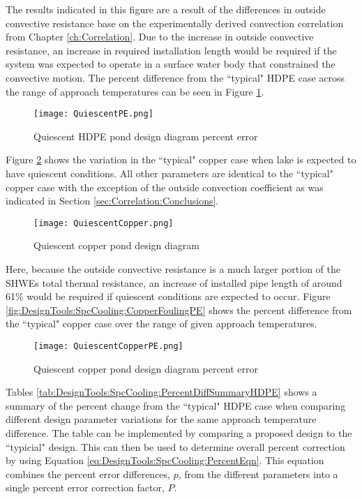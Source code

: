 The results indicated in this figure are a result of the differences in outside convective resistance base on the experimentally derived convection correlation from Chapter \ref{ch:Correlation}. Due to the increase in outside convective resistance, an increase in required installation length would be required if the system was expected to operate in a surface water body that constrained the convective motion. The percent difference from the ``typical" HDPE case across the range of approach temperatures can be seen in Figure \ref{fig:DesignTools:SpcCooling:QuiescentPE}.
	
	\begin{figure}
		\centering
		\texttt{[image: QuiescentPE.png]}
		\caption{Quiescent HDPE pond design diagram percent error}
		\label{fig:DesignTools:SpcCooling:QuiescentPE}
	\end{figure}
	
Figure \ref{fig:DesignTools:SpcCooling:QuiescentCopper} shows the variation in the ``typical" copper case when lake is expected to have quiescent conditions. All other parameters are identical to the ``typical" copper case with the exception of the outside convection coefficient as was indicated in Section \ref{sec:Correlation:Conclusions}.
	
	\begin{figure}
		\centering
		\texttt{[image: QuiescentCopper.png]}
		\caption{Quiescent copper pond design diagram}
		\label{fig:DesignTools:SpcCooling:QuiescentCopper}
	\end{figure}
	
Here, because the outside convective resistance is a much larger portion of the SHWEs total thermal resistance, an increase of installed pipe length of around 61\% would be required if quiescent conditions are expected to occur. Figure \ref{fig:DesignTools:SpcCooling:CopperFoulingPE} shows the percent difference from the ``typical" copper case over the range of given approach temperatures.
	
	\begin{figure}
		\centering
		\texttt{[image: QuiescentCopperPE.png]}
		\caption{Quiescent copper pond design diagram percent error}
		\label{fig:DesignTools:SpcCooling:QuiescentCopperPE}
	\end{figure}


Tables \ref{tab:DesignTools:SpcCooling:PercentDiffSummaryHDPE} shows a summary of the percent change from the ``typical" HDPE case when comparing different design parameter variations for the same approach temperature difference. The table can be implemented by comparing a proposed design to the ``typicial" design. This can then be used to determine overall percent correction by using Equation \ref{eq:DesignTools:SpcCooling:PercentEqn}. This equation combines the percent error differences, $p$, from the different parameters into a single percent error correction factor, $P$.

